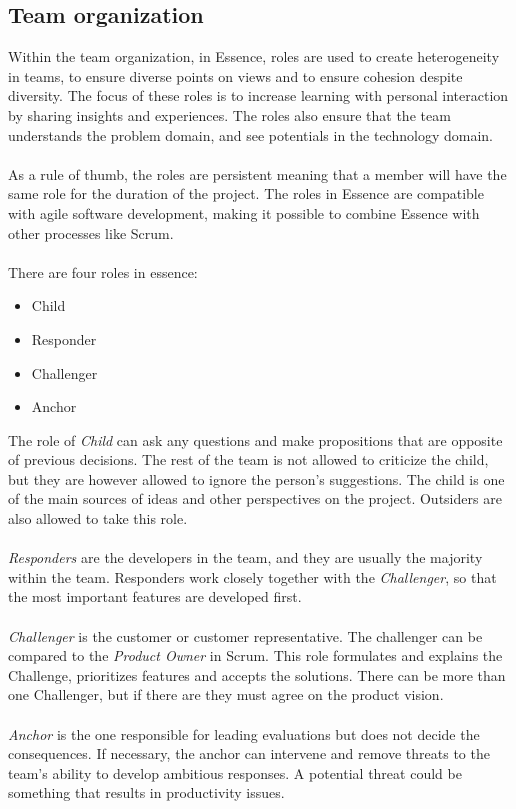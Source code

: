 \subsection{Team organization}
Within the team organization, in Essence, roles are used to create heterogeneity in teams, to ensure diverse points on views and to ensure cohesion despite diversity.
The focus of these roles is to increase learning with personal interaction by sharing insights and experiences.
The roles also ensure that the team understands the problem domain, and see potentials in the technology domain.
\\\\
As a rule of thumb, the roles are persistent meaning that a member will have the same role for the duration of the project.
The roles in Essence are compatible with agile software development, making it possible to combine Essence with other processes like Scrum.
\\\\
There are four roles in essence:
\begin{itemize}
    \item Child
    \item Responder
    \item Challenger
    \item Anchor
\end{itemize}
The role of \textit{Child} can ask any questions and make propositions that are opposite of previous decisions.
The rest of the team is not allowed to criticize the child, but they are however allowed to ignore the person's suggestions.
The child is one of the main sources of ideas and other perspectives on the project.
Outsiders are also allowed to take this role.
\\\\
\textit{Responders} are the developers in the team, and they are usually the majority within the team.
Responders work closely together with the \textit{Challenger}, so that the most important features are developed first.
\\\\
\textit{Challenger} is the customer or customer representative. 
The challenger can be compared to the \textit{Product Owner} in Scrum.
This role formulates and explains the Challenge, prioritizes features and accepts the solutions.
There can be more than one Challenger, but if there are they must agree on the product vision.
\\\\
\textit{Anchor} is the one responsible for leading evaluations but does not decide the consequences.
If necessary, the anchor can intervene and remove threats to the team's ability to develop ambitious responses. 
A potential threat could be something that results in productivity issues.
